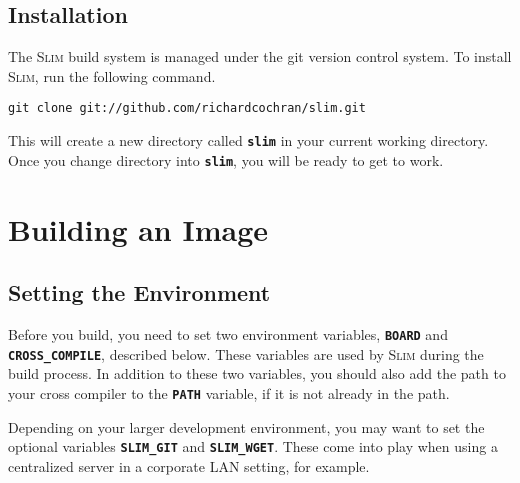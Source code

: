 \documentclass[a4paper,10pt]{article}
\newcommand{\slim}{\textsc{Slim}\xspace}
\newcommand{\fw}{\tt\bf}
\begin{document}
\subsection{Installation}

    The \slim build system is managed under the git version control
    system. To install \slim, run the following command.

\begin{lstlisting}
git clone git://github.com/richardcochran/slim.git
\end{lstlisting}

    This will create a new directory called {\fw slim} in your current
    working directory. Once you change directory into {\fw slim}, you
    will be ready to get to work.

\section{Building an Image}

\subsection{Setting the Environment}

    Before you build, you need to set two environment variables,
    {\fw BOARD} and {\fw CROSS\_COMPILE}, described below.
    These variables are used by \slim during the build process.  In
    addition to these two variables, you should also add the path to
    your cross compiler to the {\fw PATH} variable, if it is not
    already in the path.

    Depending on your larger development environment, you may want to
    set the optional variables {\fw SLIM\_GIT} and {\fw SLIM\_WGET}.
    These come into play when using a centralized server in a
    corporate LAN setting, for example.
\end{document}
